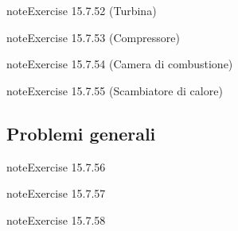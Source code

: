 \documentclass[letterpaper,10pt,italian]{jupyterBook}
\begin{document}
\begin{sphinxadmonition}{note}{Exercise 15.7.52 (Turbina)}


\end{sphinxadmonition}
 \label{exercise:ch/thermodynamics/principles-problems-exercise-52}

\begin{sphinxadmonition}{note}{Exercise 15.7.53 (Compressore)}


\end{sphinxadmonition}
 \label{exercise:ch/thermodynamics/principles-problems-exercise-53}

\begin{sphinxadmonition}{note}{Exercise 15.7.54 (Camera di combustione)}


\end{sphinxadmonition}
 \label{exercise:ch/thermodynamics/principles-problems-exercise-54}

\begin{sphinxadmonition}{note}{Exercise 15.7.55 (Scambiatore di calore)}


\end{sphinxadmonition}


\subsection{Problemi generali}
\label{\detokenize{ch/thermodynamics/principles-problems:problemi-generali}} \label{exercise:ch/thermodynamics/principles-problems-exercise-55}

\begin{sphinxadmonition}{note}{Exercise 15.7.56}


\end{sphinxadmonition}
 \label{exercise:ch/thermodynamics/principles-problems-exercise-56}

\begin{sphinxadmonition}{note}{Exercise 15.7.57}


\end{sphinxadmonition}
 \label{exercise:ch/thermodynamics/principles-problems-exercise-57}

\begin{sphinxadmonition}{note}{Exercise 15.7.58}


\end{sphinxadmonition}

\sphinxstepscope
\end{document}
